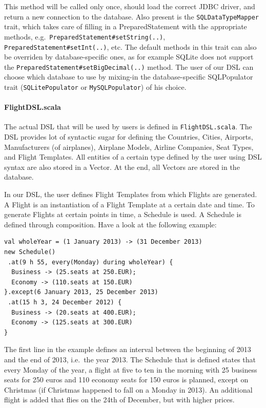 \documentclass[a4paper]{article}
\newcommand{\cc}[1]{\texttt{#1}}
\begin{document}
This method will be called only once, should load the correct JDBC driver, and return a new connection to the database.
Also present is the \cc{SQLDataTypeMapper} trait, which takes care of filling in a PreparedStatement with the appropriate methods, e.g.\ \cc{Prepared\-State\-ment\-\#set\-String(..)}, \cc{Prepared\-State\-ment\-\#set\-Int(..)}, etc.
The default methods in this trait can also be overriden by database-specific ones, as for example SQLite does not support the \cc{Prepared\-State\-ment\-\#set\-Big\-Decimal(..)} method.
The user of our DSL can choose which database to use by mixing-in the database-specific SQLPopulator trait (\cc{SQLitePopulator} or \cc{MySQL\-Populator}) of his choice.

\paragraph{FlightDSL.scala}
The actual DSL that will be used by users is defined in \cc{Flight\-DSL.scala}.
The DSL provides lot of syntactic sugar for defining the Countries, Cities, Airports, Manufacturers (of airplanes), Airplane Models, Airline Companies, Seat Types, and Flight Templates.
All entities of a certain type defined by the user using DSL syntax are also stored in a Vector.
At the end, all Vectors are stored in the database.

In our DSL, the user defines Flight Templates from which Flights are generated.
A Flight is an instantiation of a Flight Template at a certain date and time.
To generate Flights at certain points in time, a Schedule is used.
A Schedule is defined through composition.
Have a look at the following example:
\begin{lstlisting}
val wholeYear = (1 January 2013) -> (31 December 2013)
new Schedule()
 .at(9 h 55, every(Monday) during wholeYear) {
  Business -> (25.seats at 250.EUR);
  Economy -> (110.seats at 150.EUR)
}.except(6 January 2013, 25 December 2013)
 .at(15 h 3, 24 December 2012) {
  Business -> (20.seats at 400.EUR);
  Economy -> (125.seats at 300.EUR)
}
\end{lstlisting}

The first line in the example defines an interval between the beginning of 2013 and the end of 2013, i.e.\ the year 2013.
The Schedule that is defined states that every Monday of the year, a flight at five to ten in the morning with 25 business seats for 250 euros and 110 economy seats for 150 euros is planned, except on Christmas (if Christmas happened to fall on a Monday in 2013).
An additional flight is added that flies on the 24th of December, but with higher prices.
\end{document}
